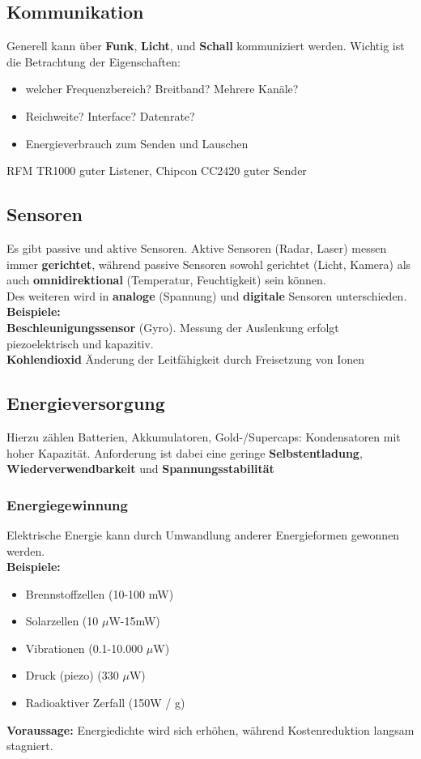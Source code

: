 \documentclass[a4paper]{article}
\begin{document}
\subsection{Kommunikation}
Generell kann über \textbf{Funk}, \textbf{Licht}, und \textbf{Schall }kommuniziert werden. Wichtig ist die Betrachtung der Eigenschaften:
\begin{itemize}
	\item welcher Frequenzbereich? Breitband? Mehrere Kanäle?
	\item Reichweite? Interface? Datenrate?
	\item Energieverbrauch zum Senden und Lauschen
\end{itemize}
RFM TR1000 guter Listener, Chipcon CC2420 guter Sender
\subsection{Sensoren}
Es gibt passive und aktive Sensoren. Aktive Sensoren (Radar, Laser) messen immer \textbf{gerichtet}, während passive Sensoren sowohl gerichtet (Licht, Kamera) als auch \textbf{omnidirektional} (Temperatur, Feuchtigkeit) sein können.\\
Des weiteren wird in \textbf{analoge }(Spannung) und \textbf{digitale }Sensoren unterschieden.\\
\textbf{Beispiele:}\\
 \textbf{Beschleunigungssensor }(Gyro). Messung der Auslenkung erfolgt piezoelektrisch und kapazitiv.\\
 \textbf{Kohlendioxid} Änderung der Leitfähigkeit durch Freisetzung von Ionen
\subsection{Energieversorgung}
Hierzu zählen Batterien, Akkumulatoren, Gold-/Supercaps: Kondensatoren mit hoher Kapazität. Anforderung ist dabei eine geringe \textbf{Selbstentladung}, \textbf{Wiederverwendbarkeit }und \textbf{Spannungsstabilität}
\subsubsection{Energiegewinnung}
Elektrische Energie kann durch Umwandlung anderer Energieformen gewonnen werden.\\
\textbf{Beispiele:}
\begin{itemize}
	\item Brennstoffzellen (10-100 mW)
	\item Solarzellen (10 $\mu$W-15mW)
	\item Vibrationen (0.1-10.000 $\mu$W)
	\item Druck (piezo) (330 $\mu$W) 
	\item Radioaktiver Zerfall (150W / g)
\end{itemize} 
\textbf{Voraussage:} Energiedichte wird sich erhöhen, während Kostenreduktion langsam stagniert.
\end{document}
